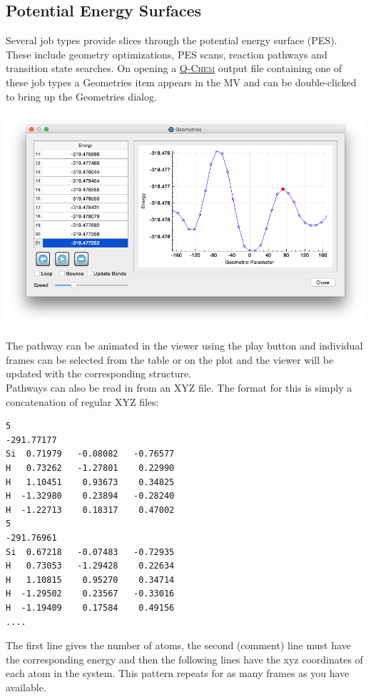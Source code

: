 \documentclass[a4paper,12pt]{article}
\newcommand{\qchem}{\href{http://q-chem.com}{{\scshape Q-Chem}}}
\begin{document}
\newpage
\subsection{Potential Energy Surfaces}

Several job types provide slices through the potential energy surface (PES).
These include geometry optimizations, PES scans, reaction pathways  and
transition state searches.  On opening a \qchem{} output file containing one of
these job types a Geometries item appears in the MV and can be double-clicked
to bring up the Geometries dialog.
\begin{center}
\includegraphics[scale=0.40]{figures/PesScan.png} \\
\end{center}
The pathway can be animated in the viewer using the play button and individual
frames can be selected from the table or on the plot and the viewer will be
updated with the corresponding structure.\\

Pathways can also be read in from an XYZ file.  The format for this is simply a
concatenation of regular XYZ files:
{\footnotesize
\begin{verbatim}
5
-291.77177
Si  0.71979   -0.08082   -0.76577  
H   0.73262   -1.27801    0.22990   
H   1.10451    0.93673    0.34825   
H  -1.32980    0.23894   -0.28240  
H  -1.22713    0.18317    0.47002   
5
-291.76961
Si  0.67218   -0.07483   -0.72935  
H   0.73053   -1.29428    0.22634   
H   1.10815    0.95270    0.34714   
H  -1.29502    0.23567   -0.33016  
H  -1.19409    0.17584    0.49156 
....
\end{verbatim}
}
The first line gives the number of atoms, the second (comment) line must have
the corresponding energy and then the following lines have the xyz coordinates
of each atom in the system.  This pattern repeats for as many frames as you have
available.
\end{document}
